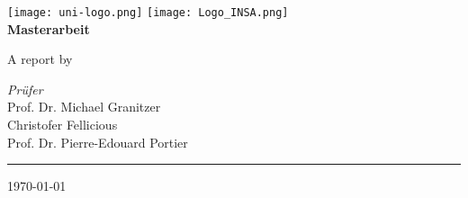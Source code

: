 \begin{titlepage}
    \centering
    \begin{onehalfspace}
    	
        	\texttt{[image: uni-logo.png]}
			\hspace*{1.0cm}
			\texttt{[image: Logo\_INSA.png]}\\
        	\vspace{1.0cm}
        	{\Large \bfseries Masterarbeit}\\

        	\vspace{2.5cm}

            \begin{doublespace}
            	{\textsf{\Huge{\thetitle}}}
            \end{doublespace}

        	\vspace{2cm}

            {\Large A report by}\\

        	\vspace{1cm}

        	{\bfseries \large{\theauthor}}

        	\vfill

        	{\Large
                \textit{Pr\"ufer} \\
                Prof. Dr. Michael Granitzer\\
				Christofer Fellicious\\
				Prof. Dr. Pierre-Edouard Portier\\ 
        	}

        	\vspace{1.5cm}

        	\parbox{\linewidth}{\hrule\strut}

            \vfill

			{\large \today}
    \end{onehalfspace}
\end{titlepage}
